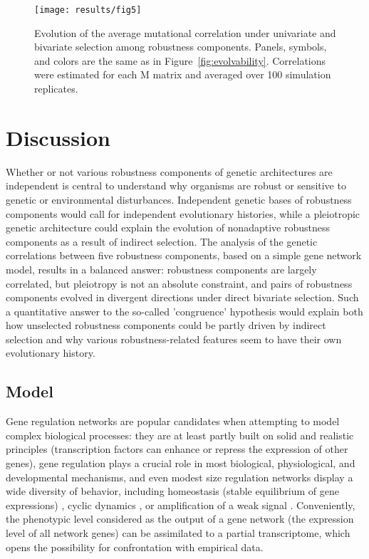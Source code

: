 \documentclass[10pt,a4paper]{article}
\newcommand{\M}{\bm{\mathrm M}}
\begin{document}
\begin{figure}[thp!]
\begin{flushright}
\texttt{[image: results/fig5]}
\caption{\color{Gray} \label{fig:evolcor} Evolution of the average mutational correlation under univariate and bivariate selection among robustness components. Panels, symbols, and colors are the same as in Figure~\ref{fig:evolvability}. Correlations were estimated for each $\M$ matrix and averaged over 100 simulation replicates. }
\end{flushright}%
\end{figure}


\section{Discussion}

Whether or not various robustness components of genetic architectures are independent is central to understand why organisms are robust or sensitive to genetic or environmental disturbances. Independent genetic bases of robustness components would call for independent evolutionary histories, while a pleiotropic genetic architecture could explain the evolution of nonadaptive robustness components as a result of indirect selection. The analysis of the genetic correlations between five robustness components, based on a simple gene network model, results in a balanced answer: robustness components are largely correlated, but pleiotropy is not an absolute constraint, and pairs of robustness components evolved in divergent directions under direct bivariate selection. Such a quantitative answer to the so-called 'congruence' hypothesis \citep{dHW+03} would explain both how unselected robustness components could be partly driven by indirect selection and why various robustness-related features seem to have their own evolutionary history. 

\subsection{Model}

Gene regulation networks are popular candidates when attempting to model complex biological processes: they are at least partly built on solid and realistic principles (transcription factors can enhance or repress the expression of other genes), gene regulation plays a crucial role in most biological, physiological, and developmental mechanisms, and even modest size regulation networks display a wide diversity of behavior, including homeostasis (stable equilibrium of gene expressions) \citep{Ste99}, cyclic dynamics \citep{LG03,ARB+10}, or amplification of a weak signal \citep{HB08}. Conveniently, the phenotypic level considered as the output of a gene network (the expression level of all network genes) can be assimilated to a partial transcriptome, which opens the possibility for confrontation with empirical data. 
\end{document}

